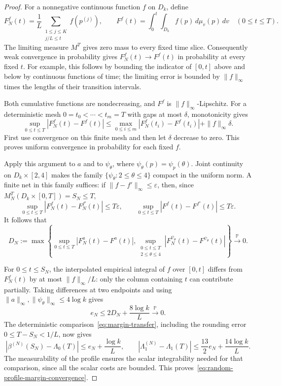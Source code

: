\documentclass[11pt]{article}
\numberwithin{equation}{section}
\theoremstyle{definition}
\theoremstyle{remark}
\newcommand{\1}{\mathbf 1}
\begin{document}
\begin{proof}
For a nonnegative continuous function $f$ on $D_k$, define
\[
 F_N^f(t)=\frac1L\sum_{\substack{1\le j\le K\\j/L\le t}}f(p^{(j)}),
 \qquad
 F^f(t)=\int_0^t\int_{D_k}f(p)\,d\mu_v(p)\,dv
 \quad(0\le t\le T).
\]
The limiting measure $M^T$ gives zero mass to every fixed time slice.
Consequently weak convergence in probability gives
$F_N^f(t)\to F^f(t)$ in probability at every fixed $t$.
For example, this follows by bounding the indicator of $[0,t]$
above and below by continuous functions of time; the limiting error
is bounded by $\|f\|_\infty$ times the lengths of their transition
intervals.

Both cumulative functions are nondecreasing, and $F^f$ is
$\|f\|_\infty$-Lipschitz. For a deterministic mesh
$0=t_0<\cdots<t_m=T$ with gaps at most $\delta$, monotonicity gives
\[
 \sup_{0\le t\le T}|F_N^f(t)-F^f(t)|
 \le\max_{0\le i\le m}|F_N^f(t_i)-F^f(t_i)|
                         +\|f\|_\infty\delta.
\]
First use convergence on this finite mesh and then let $\delta$
decrease to zero. This proves uniform convergence in probability
for each fixed $f$.

Apply this argument to $a$ and to $\psi_\theta$, where
$\psi_\theta(p)=\psi_p(\theta)$. Joint continuity on
$D_k\times[2,4]$ makes the family $\{\psi_\theta:2\le\theta\le4\}$
compact in the uniform norm. A finite net in this family suffices:
if $\|f-f'\|_\infty\le\varepsilon$, then, since
$M_N^T(D_k\times[0,T])=S_N\le T$,
\[
 \sup_{0\le t\le T}|F_N^f(t)-F_N^{f'}(t)|\le T\varepsilon,
 \qquad
 \sup_{0\le t\le T}|F^f(t)-F^{f'}(t)|\le T\varepsilon.
\]
It follows that
\[
 D_N:=\max\left\{
 \sup_{0\le t\le T}|F_N^a(t)-F^a(t)|,
 \sup_{\substack{0\le t\le T\\2\le\theta\le4}}
       |F_N^{\psi_\theta}(t)-F^{\psi_\theta}(t)|
                    \right\}\xrightarrow{\mathbb P}0.
\]

For $0\le t\le S_N$, the interpolated empirical integral of $f$
over $[0,t]$ differs from $F_N^f(t)$ by at most
$\|f\|_\infty/L$: only the column containing $t$ can contribute
partially. Taking differences at two endpoints and using
$\|a\|_\infty,\|\psi_\theta\|_\infty\le4\log k$ gives
\[
 e_N\le2D_N+\frac{8\log k}{L}
          \xrightarrow{\mathbb P}0.
\]
The deterministic comparison~\eqref{eq:margin-transfer}, including
the rounding error $0\le T-S_N<1/L$, now gives
\[
 |\beta^{(N)}(S_N)-\Lambda_0(T)|
       \le e_N+\frac{\log k}{L},\qquad
 |\Lambda_1^{(N)}-\Lambda_1(T)|
       \le\frac{13}{2}e_N+\frac{14\log k}{L}.
\]
The measurability of the profile ensures the scalar integrability
needed for that comparison, since all the scalar costs are bounded.
This proves~\eqref{eq:random-profile-margin-convergence}.


\end{proof}
\end{document}
